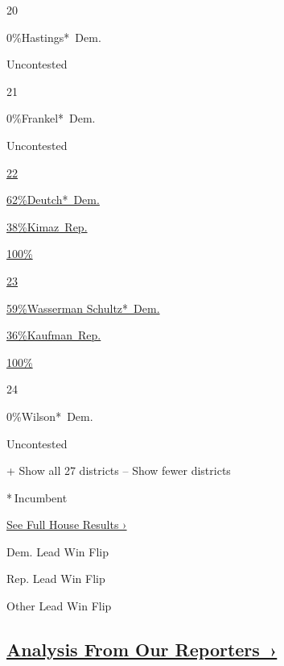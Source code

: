 20

 0\%Hastings*~Dem.

Uncontested

21

 0\%Frankel*~Dem.

Uncontested

\href{https://www.nytimes3xbfgragh.onion/elections/results/florida-house-district-22}{22}

\href{https://www.nytimes3xbfgragh.onion/elections/results/florida-house-district-22}{
62\%Deutch*~Dem.}

\href{https://www.nytimes3xbfgragh.onion/elections/results/florida-house-district-22}{
38\%Kimaz~Rep.}

\href{https://www.nytimes3xbfgragh.onion/elections/results/florida-house-district-22}{100\%}

\href{https://www.nytimes3xbfgragh.onion/elections/results/florida-house-district-22}{}

\href{https://www.nytimes3xbfgragh.onion/elections/results/florida-house-district-23}{23}

\href{https://www.nytimes3xbfgragh.onion/elections/results/florida-house-district-23}{
59\%Wasserman Schultz*~Dem.}

\href{https://www.nytimes3xbfgragh.onion/elections/results/florida-house-district-23}{
36\%Kaufman~Rep.}

\href{https://www.nytimes3xbfgragh.onion/elections/results/florida-house-district-23}{100\%}

\href{https://www.nytimes3xbfgragh.onion/elections/results/florida-house-district-23}{}

24

 0\%Wilson*~Dem.

Uncontested

+ Show all 27 districts -- Show fewer districts

* Incumbent~

\href{https://www.nytimes3xbfgragh.onion/interactive/2018/11/06/us/elections/results-house-elections.html}{See
Full House Results ›}

Dem. Lead Win Flip

Rep. Lead Win Flip

Other Lead Win Flip

\hypertarget{analysis-from-our-reporters-}{%
\subsection{\texorpdfstring{\href{https://www.nytimes3xbfgragh.onion/interactive/2018/11/06/us/elections/live-midterm-election-analysis-updates.html}{Analysis
From Our
Reporters~›}}{Analysis From Our Reporters~›}}\label{analysis-from-our-reporters-}}

